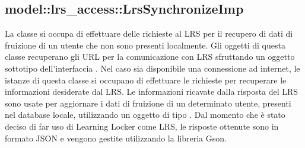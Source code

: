 \documentclass[../Tesi.tex]{subfiles}
\begin{document}
		\subsection{model::lrs\_access::LrsSynchronizeImp}
		La classe  si occupa di effettuare delle richieste al LRS per 
		il recupero di dati di fruizione di un utente che non sono presenti localmente. Gli oggetti di questa classe recuperano gli URL per la comunicazione con LRS sfruttando un oggetto sottotipo dell'interfaccia . Nel caso sia disponibile una connessione ad internet, le istanze di questa classe si occupano di effettuare le richieste per recuperare le informazioni desiderate dal LRS. Le informazioni ricavate dalla risposta del LRS sono usate per aggiornare i dati di fruizione di un determinato utente, presenti nel database locale, utilizzando un oggetto di tipo . Dal momento che è stato deciso di far uso di Learning Locker come LRS, le risposte ottenute sono in formato JSON e vengono gestite utilizzando la libreria Gson.
\end{document}

